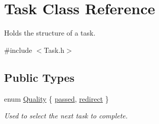 \hypertarget{class_task}{}\section{Task Class Reference}
\label{class_task}


Holds the structure of a task.  




{\ttfamily \#include $<$Task.\+h$>$}

\subsection*{Public Types}
\begin{DoxyCompactItemize}
\item 
enum \mbox{\hyperlink{class_task_a6b8b1fc5858cbd77055e79d6381282fb}{Quality}} \{ \mbox{\hyperlink{class_task_a6b8b1fc5858cbd77055e79d6381282fbafc26836e15aeaddaab5eaca6d03dadba}{passed}}, 
\mbox{\hyperlink{class_task_a6b8b1fc5858cbd77055e79d6381282fba9a7ec146540b101a16e2da2bd61e5b59}{redirect}}
 \}
\begin{DoxyCompactList}\small\item\em Used to select the next task to complete. \end{DoxyCompactList}\end{DoxyCompactItemize}
